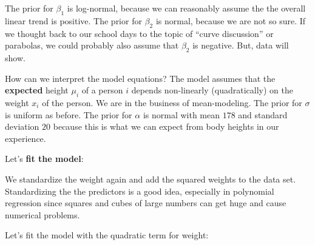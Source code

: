 \documentclass[
]{book}
\newenvironment{Shaded}{\begin{snugshade}}{\end{snugshade}}
\newcommand{\AttributeTok}[1]{\textcolor[rgb]{0.13,0.29,0.53}{#1}}
\newcommand{\CommentTok}[1]{\textcolor[rgb]{0.56,0.35,0.01}{\textit{#1}}}
\newcommand{\DecValTok}[1]{\textcolor[rgb]{0.00,0.00,0.81}{#1}}
\newcommand{\FloatTok}[1]{\textcolor[rgb]{0.00,0.00,0.81}{#1}}
\newcommand{\FunctionTok}[1]{\textcolor[rgb]{0.13,0.29,0.53}{\textbf{#1}}}
\newcommand{\NormalTok}[1]{#1}
\newcommand{\OtherTok}[1]{\textcolor[rgb]{0.56,0.35,0.01}{#1}}
\newcommand{\SpecialCharTok}[1]{\textcolor[rgb]{0.81,0.36,0.00}{\textbf{#1}}}
\begin{document}
The prior for \(\beta_1\) is log-normal, because we can reasonably assume
the the overall linear trend is positive. The prior for \(\beta_2\) is normal, because
we are not so sure. If we thought back to our school days to the topic of
``curve discussion'' or parabolas, we could probably also assume that \(\beta_2\) is negative.
But, data will show.

How can we interpret the model equations?
The model assumes that the \textbf{expected} height \(\mu_i\) of a person \(i\)
depends non-linearly (quadratically) on the weight \(x_i\) of the person.
We are in the business of mean-modeling.
The prior for \(\sigma\) is uniform as before.
The prior for \(\alpha\) is normal with mean \(178\) and standard deviation \(20\)
because this is what we can expect from body heights in our experience.

Let's \textbf{fit the model}:

We standardize the weight again and add the squared weights to the data set.
Standardizing the the predictors is a good idea, especially in polynomial regression
since squares and cubes of large numbers can get huge and cause numerical problems.

Let's fit the model with the quadratic term for weight:

\begin{Shaded}
\end{Shaded}
\end{document}
